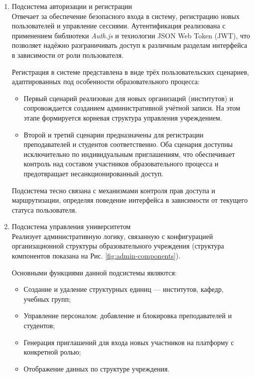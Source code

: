 \begin{enumerate}
  \item Подсистема авторизации и регистрации\\
  Отвечает за обеспечение безопасного входа в систему, регистрацию новых пользователей и управление сессиями. Аутентификация реализована с применением библиотеки \textit{Auth.js} и технологии JSON Web Token (JWT), что позволяет надёжно разграничивать доступ к различным разделам интерфейса в зависимости от роли пользователя.

  Регистрация в системе представлена в виде трёх пользовательских сценариев, адаптированных под особенности образовательного процесса:
  \begin{itemize}
    \item Первый сценарий реализован для новых организаций (институтов) и сопровождается созданием административной учётной записи. На этом этапе формируется корневая структура управления учреждением.
    \item Второй и третий сценарии предназначены для регистрации преподавателей и студентов соответственно. Оба сценария доступны исключительно по индивидуальным приглашениям, что обеспечивает контроль над составом участников образовательного процесса и предотвращает несанкционированный доступ.
  \end{itemize}
  
  Подсистема тесно связана с механизмами контроля прав доступа и маршрутизации, определяя поведение интерфейса в зависимости от текущего статуса пользователя.

  \item Подсистема управления университетом\\
  Реализует административную логику, связанную с конфигурацией организационной структуры образовательного учреждения (структура компонентов показана на Рис. \ref{fig:admin-components}).
  
  Основными функциями данной подсистемы являются:
  \begin{itemize}
    \item Создание и удаление структурных единиц — институтов, кафедр, учебных групп;
    \item Управление персоналом: добавление и блокировка преподавателей и студентов;
    \item Генерация приглашений для входа новых участников на платформу с конкретной ролью;
    \item Отображение данных по структуре учреждения.
  \end{itemize}
  

\end{enumerate}
